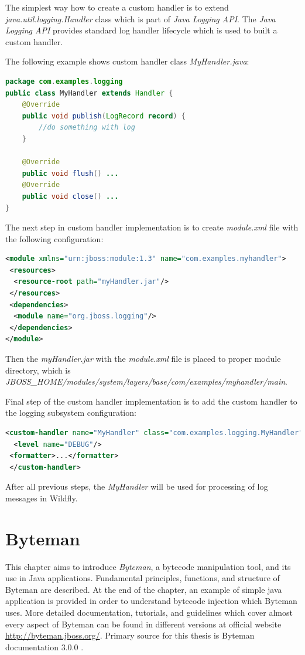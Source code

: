 \documentclass[12pt,oneside]{fithesis2}
\begin{document}
The simplest way how to create a custom handler is to extend \textit{java.util.logging.Handler} class which is part of \textit{Java Logging API}. The \textit{Java Logging API} provides standard log handler lifecycle which is used to built a custom handler.

The following example shows custom handler class \textit{MyHandler.java}:
\begin{lstlisting}[caption = Custom handler class, label = custom_handler_class, language=Java]
package com.examples.logging
public class MyHandler extends Handler {
	@Override
	public void publish(LogRecord record) {
		//do something with log
	}
	
	@Override
	public void flush() ...
	@Override
	public void close() ...
}
\end{lstlisting}

The next step in custom handler implementation is to create \textit{module.xml} file with the following configuration:

\begin{lstlisting}[caption = Custom handler module descriptor, label = custom_handler_module_descriptor, language=XML]
<module xmlns="urn:jboss:module:1.3" name="com.examples.myhandler">
 <resources>
  <resource-root path="myHandler.jar"/>
 </resources>
 <dependencies>
  <module name="org.jboss.logging"/>
 </dependencies>    
</module>
\end{lstlisting}

Then the \textit{myHandler.jar} with the \textit{module.xml} file is placed to proper module directory, which is \textit{JBOSS\_HOME/modules/system/layers/base/com/examples/myhandler/main}.

Final step of the custom handler implementation is to add the custom handler to the logging subsystem configuration:
\begin{lstlisting}[caption = Adding custom handler to the logging subsystem configuration, label = custom_handler_logging_subsystem, language=XML]
 <custom-handler name="MyHandler" class="com.examples.logging.MyHandler" module="com.examples.myhandler">
  <level name="DEBUG"/>
 <formatter>...</formatter>
 </custom-handler>
\end{lstlisting}

After all previous steps, the \textit{MyHandler} will be used for processing of log messages in Wildfly.

\chapter{Byteman}
This chapter aims to introduce \textit{Byteman}, a bytecode manipulation tool, and its use in Java applications. Fundamental principles, functions, and structure of Byteman are described.
At the end of the chapter, an example of simple java application is provided in order to understand bytecode injection which Byteman uses. More detailed documentation, tutorials, and guidelines 
which cover almost every aspect of Byteman can be found in different versions at official website \url{http://byteman.jboss.org/}. Primary source for this thesis is Byteman documentation 3.0.0 \cite{byteman_doc}.
\end{document}
